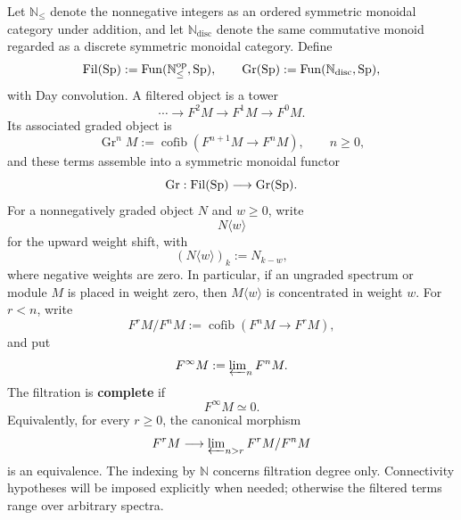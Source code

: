 \begin{definition}
\label{def:filtered-graded-spectral-objects}
Let \(\mathbb N_{\leq}\) denote the nonnegative integers as an ordered
symmetric monoidal category under addition, and let
\(\mathbb N_{\mathrm{disc}}\) denote the same commutative monoid regarded as a
discrete symmetric monoidal category. Define
\[
    \operatorname{Fil}(\operatorname{Sp})
    :=
    \operatorname{Fun}(\mathbb N_{\leq}^{\mathrm{op}},\operatorname{Sp}),
    \qquad
    \operatorname{Gr}(\operatorname{Sp})
    :=
    \operatorname{Fun}(\mathbb N_{\mathrm{disc}},\operatorname{Sp}),
\]
with Day convolution. A filtered object is a tower
\[
    \cdots\longrightarrow F^2M\longrightarrow F^1M\longrightarrow F^0M.
\]
Its associated graded object is
\[
    \operatorname{Gr}^nM
    :=
    \operatorname{cofib}(F^{n+1}M\to F^nM),
    \qquad n\geq0,
\]
and these terms assemble into a symmetric monoidal functor
\[
    \operatorname{Gr}:
    \operatorname{Fil}(\operatorname{Sp})
    \longrightarrow
    \operatorname{Gr}(\operatorname{Sp}).
\]
For a nonnegatively graded object \(N\) and \(w\geq0\), write
\[
    N\langle w\rangle
\]
for the upward weight shift, with
\[
    (N\langle w\rangle)_k:=N_{k-w},
\]
where negative weights are zero. In particular, if an ungraded spectrum or
module \(M\) is placed in weight zero, then \(M\langle w\rangle\) is
concentrated in weight \(w\).
For \(r<n\), write
\[
    F^rM/F^nM
    :=
    \operatorname{cofib}(F^nM\to F^rM),
\]
and put
\[
    F^\infty M:=\varprojlim\nolimits_nF^nM.
\]
The filtration is \textbf{complete} if
\[
    F^\infty M\simeq0.
\]
Equivalently, for every \(r\geq0\), the canonical morphism
\[
    F^rM
    \longrightarrow
    \varprojlim\nolimits_{n>r}F^rM/F^nM
\]
is an equivalence. The indexing by \(\mathbb N\) concerns filtration degree
only. Connectivity hypotheses will be imposed explicitly when needed; otherwise the
filtered terms range over arbitrary spectra.
\end{definition}

